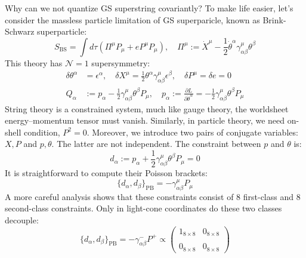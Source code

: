 \documentclass{beamer}
\begin{document}
\begin{frame}[allowframebreaks]{Why can we not quantize GS superstring covariantly?}\label{GS}
	To make life easier, let's consider the massless particle limitation of GS superparicle, known as Brink-Schwarz superparticle:
	\begin{equation*}
		S_{\mathrm{BS}}=\int d\tau\left(\Pi^{\mu}P_{\mu}+eP^{\mu}P_{\mu}\right),\quad\Pi^{\mu}:=\dot{X}^{\mu}-\frac{1}{2}\dot{\theta}^{\alpha}\gamma_{\alpha\beta}^{\mu}\theta^{\beta}
	\end{equation*}
	This theory has $\mathcal{N}=1$ supersymmetry:
	\begin{equation*}
		\begin{aligned}
			\delta\theta^{\alpha}&=\epsilon^{\alpha},\quad\delta X^{\mu}=\frac{1}{2}\theta^{\alpha}\gamma_{\alpha\beta}^{\mu}\epsilon^{\beta},\quad\delta P^{\mu}=\delta e=0\\Q_{\alpha}&:=p_{\alpha}-\frac{1}{2}\gamma_{\alpha\beta}^{\mu}\theta^{\beta}P_{\mu},\quad p_{\alpha}:=\frac{\partial L}{\partial\dot{\theta}^{\alpha}}=-\frac{1}{2}\gamma_{\alpha\beta}^{\mu}\theta^{\beta}P_{\mu}
		\end{aligned}
	\end{equation*}
	String theory is a constrained system, much like gauge theory, the worldsheet energy–momentum tensor must vanish. Similarly, in particle theory, we need on-shell condition, $P^2=0$. Moreover, we introduce two pairs of conjugate variables: ${X, P}$ and ${p, \theta}$. The latter are not independent. The constraint between $p$ and $\theta$ is:
	\begin{equation*}
		d_{\alpha}:=p_{\alpha}+\frac{1}{2}\gamma_{\alpha\beta}^{\mu}\theta^{\beta}P_{\mu}=0
	\end{equation*}
	It is straightforward to compute their Poisson brackets:
	\begin{equation*}
		\{d_\alpha,d_\beta\}_{\mathrm{PB}}=-\gamma_{\alpha\beta}^\mu P_\mu
	\end{equation*}
	A more careful analysis shows that these constraints consist of 8 first-class and 8 second-class constraints. Only in light-cone coordinates do these two classes decouple:
	\begin{equation*}
		\{d_\alpha,d_\beta\}_{\mathrm{PB}}=-\gamma_{\alpha\beta}^-P^+\propto\begin{pmatrix}1_{8\times8}&0_{8\times8}\\\\0_{8\times8}&0_{8\times8}\end{pmatrix}
	\end{equation*}

\end{frame}
\end{document}
